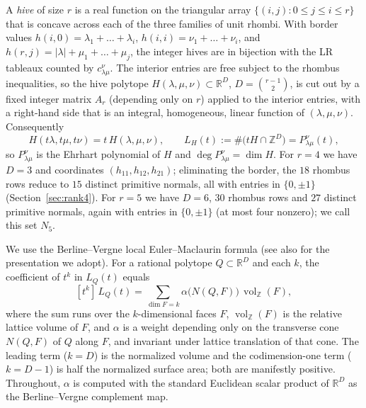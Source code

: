 \documentclass[11pt]{amsart}
\theoremstyle{definition}
\DeclareMathOperator{\vol}{vol}
\newcommand{\Z}{\mathbb{Z}}
\newcommand{\R}{\mathbb{R}}
\newcommand{\lam}{\lambda}
\begin{document}
A \emph{hive} of size $r$ is a real function on the triangular array
$\{(i,j):0\le j\le i\le r\}$ that is concave across each of the three families
of unit rhombi. With border values
$h(i,0)=\lam_1+\dots+\lam_i$, $h(i,i)=\nu_1+\dots+\nu_i$, and
$h(r,j)=|\lam|+\mu_1+\dots+\mu_j$, the integer hives are in bijection with the
LR tableaux counted by $c^{\nu}_{\lam\mu}$. The interior entries are free
subject to the rhombus inequalities, so the hive polytope
$H(\lam,\mu,\nu)\subset\R^{D}$, $D=\binom{r-1}{2}$, is cut out by a fixed
integer matrix $A_r$ (depending only on $r$) applied to the interior entries,
with a right-hand side that is an integral, homogeneous, linear function of
$(\lam,\mu,\nu)$. Consequently
\[
  H(t\lam,t\mu,t\nu)=t\,H(\lam,\mu,\nu),\qquad
  L_H(t):=\#\bigl(tH\cap\Z^{D}\bigr)=P^{\nu}_{\lam\mu}(t),
\]
so $P^{\nu}_{\lam\mu}$ is the Ehrhart polynomial of $H$ and
$\deg P^{\nu}_{\lam\mu}=\dim H$. For $r=4$ we have $D=3$ and coordinates
$(h_{11},h_{12},h_{21})$; eliminating the border, the $18$ rhombus rows reduce
to $15$ distinct primitive normals, all with entries in $\{0,\pm1\}$
(Section~\ref{sec:rank4}). For $r=5$ we have $D=6$, $30$ rhombus rows and $27$
distinct primitive normals, again with entries in $\{0,\pm1\}$ (at most four
nonzero); we call this set $N_5$.

We use the Berline--Vergne local Euler--Maclaurin formula
\cite{BerlineVergne} (see also \cite{RingSchurmann} for the presentation we
adopt). For a rational polytope $Q\subset\R^{D}$ and each $k$, the coefficient
of $t^{k}$ in $L_{Q}(t)$ equals
\begin{equation}\label{eq:bv}
  [t^{k}]\,L_{Q}(t)=\sum_{\dim F=k}\alpha\bigl(N(Q,F)\bigr)\,\vol_{\Z}(F),
\end{equation}
where the sum runs over the $k$-dimensional faces $F$, $\vol_{\Z}(F)$ is the
relative lattice volume of $F$, and $\alpha$ is a weight depending only on the
transverse cone $N(Q,F)$ of $Q$ along $F$, and invariant under lattice
translation of that cone. The leading term ($k=D$) is the normalized volume and
the codimension-one term ($k=D-1$) is half the normalized surface area; both are
manifestly positive. Throughout, $\alpha$ is computed with the standard
Euclidean scalar product of $\R^{D}$ as the Berline--Vergne complement map.
\end{document}
